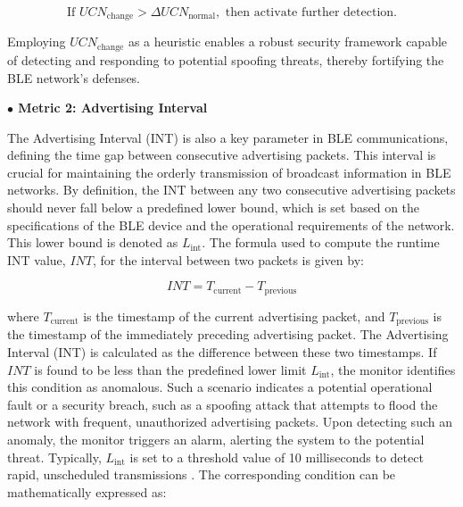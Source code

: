 \vspace{-4pt}

\begin{equation}
\text{If } UCN_{\text{change}} > \Delta UCN_{\text{normal}}, \text{ then activate further detection.}
\end{equation}

Employing \( UCN_{\text{change}} \) as a heuristic enables a robust security framework capable of detecting and responding to potential spoofing threats, thereby fortifying the BLE network's defenses.

\vspace{6pt}

\noindent \textbf{$\bullet$ Metric 2: Advertising Interval}

\noindent The Advertising Interval (INT) is also a key parameter in BLE communications, defining the time gap between consecutive advertising packets. This interval is crucial for maintaining the orderly transmission of broadcast information in BLE networks. By definition, the INT between any two consecutive advertising packets should never fall below a predefined lower bound, which is set based on the specifications of the BLE device and the operational requirements of the network. This lower bound is denoted as $L_{\text{int}}$. The formula used to compute the runtime INT value, $INT$, for the interval between two packets is given by:

\vspace{-4pt}

\begin{equation}
INT = T_{\text{current}} - T_{\text{previous}}
\end{equation}

where $T_{\text{current}}$ is the timestamp of the current advertising packet, and $T_{\text{previous}}$ is the timestamp of the immediately preceding advertising packet. The Advertising Interval (INT) is calculated as the difference between these two timestamps. If \(INT\) is found to be less than the predefined lower limit \(L_{\text{int}}\), the monitor identifies this condition as anomalous. Such a scenario indicates a potential operational fault or a security breach, such as a spoofing attack that attempts to flood the network with frequent, unauthorized advertising packets. Upon detecting such an anomaly, the monitor triggers an alarm, alerting the system to the potential threat. Typically, \(L_{\text{int}}\) is set to a threshold value of 10 milliseconds to detect rapid, unscheduled transmissions \cite{wu2020blueshield}. The corresponding condition can be mathematically expressed as:

